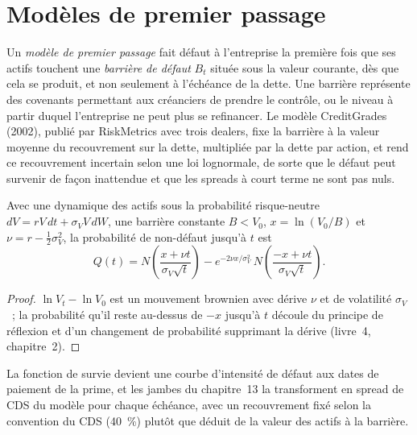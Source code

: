 \section{Modèles de premier passage}

\begin{definition}\label{def:rc:structural-credit-models:fp}
Un \emph{modèle de premier passage} fait défaut à l'entreprise la première fois que
ses actifs touchent une \emph{barrière de défaut} $B_t$ située sous la
valeur courante, dès que cela se produit, et non seulement à l'échéance de la dette. Une barrière représente
des covenants permettant aux créanciers de prendre le contrôle, ou le niveau à partir duquel l'entreprise ne peut plus
se refinancer. Le modèle CreditGrades (2002), publié par RiskMetrics avec trois dealers, fixe la barrière
à la valeur moyenne du recouvrement sur la dette, multipliée par la dette par action, et rend ce
recouvrement incertain selon une loi lognormale, de sorte que le défaut peut survenir de façon inattendue et que les spreads à court terme ne sont pas nuls.
\end{definition}

\begin{proposition}\label{prop:rc:structural-credit-models:fp}
Avec une dynamique des actifs sous la probabilité risque-neutre $dV = rV\,dt+\sigma_VV\,dW$, une barrière constante $B<V_0$,
$x = \ln(V_0/B)$ et $\nu = r-\tfrac12\sigma_V^2$, la probabilité de non-défaut jusqu'à $t$ est
\[
Q(t) = N\!\left(\frac{x+\nu t}{\sigma_V\sqrt t}\right)
- e^{-2\nu x/\sigma_V^2}\,N\!\left(\frac{-x+\nu t}{\sigma_V\sqrt t}\right).
\]
\end{proposition}
\begin{proof}
$\ln V_t-\ln V_0$ est un mouvement brownien avec dérive $\nu$ et de volatilité $\sigma_V$~; la
probabilité qu'il reste au-dessus de $-x$ jusqu'à $t$ découle du principe de réflexion et
d'un changement de probabilité supprimant la dérive (livre~4, chapitre~2).
\end{proof}

\label{lst:rc:structural-credit-models:fp}

La fonction de survie devient une courbe d'intensité de défaut aux dates de paiement de la
prime, et les jambes du chapitre~13 la transforment en spread de CDS du modèle pour chaque échéance, avec un recouvrement fixé selon la
convention du CDS (40~\%) plutôt que déduit de la valeur des actifs à la barrière.

